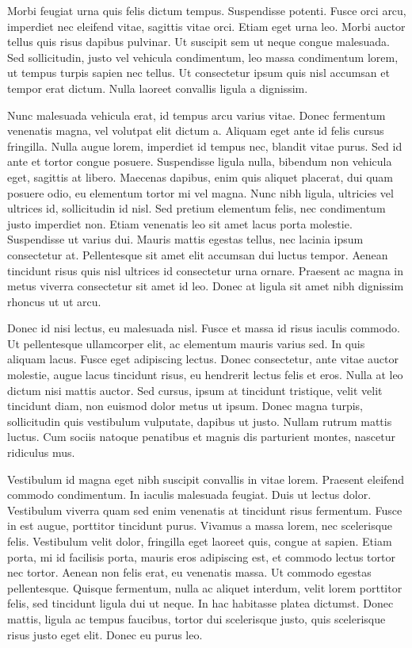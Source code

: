 \documentclass[oneside, a4paper, onecolumn, 11pt]{article}
\begin{document}
Morbi feugiat urna quis felis dictum tempus. Suspendisse potenti. Fusce orci arcu, imperdiet nec eleifend vitae, sagittis vitae orci. Etiam eget urna leo. Morbi auctor tellus quis risus dapibus pulvinar. Ut suscipit sem ut neque congue malesuada. Sed sollicitudin, justo vel vehicula condimentum, leo massa condimentum lorem, ut tempus turpis sapien nec tellus. Ut consectetur ipsum quis nisl accumsan et tempor erat dictum. Nulla laoreet convallis ligula a dignissim.

Nunc malesuada vehicula erat, id tempus arcu varius vitae. Donec fermentum venenatis magna, vel volutpat elit dictum a. Aliquam eget ante id felis cursus fringilla. Nulla augue lorem, imperdiet id tempus nec, blandit vitae purus. Sed id ante et tortor congue posuere. Suspendisse ligula nulla, bibendum non vehicula eget, sagittis at libero. Maecenas dapibus, enim quis aliquet placerat, dui quam posuere odio, eu elementum tortor mi vel magna. Nunc nibh ligula, ultricies vel ultrices id, sollicitudin id nisl. Sed pretium elementum felis, nec condimentum justo imperdiet non. Etiam venenatis leo sit amet lacus porta molestie. Suspendisse ut varius dui. Mauris mattis egestas tellus, nec lacinia ipsum consectetur at. Pellentesque sit amet elit accumsan dui luctus tempor. Aenean tincidunt risus quis nisl ultrices id consectetur urna ornare. Praesent ac magna in metus viverra consectetur sit amet id leo. Donec at ligula sit amet nibh dignissim rhoncus ut ut arcu.

Donec id nisi lectus, eu malesuada nisl. Fusce et massa id risus iaculis commodo. Ut pellentesque ullamcorper elit, ac elementum mauris varius sed. In quis aliquam lacus. Fusce eget adipiscing lectus. Donec consectetur, ante vitae auctor molestie, augue lacus tincidunt risus, eu hendrerit lectus felis et eros. Nulla at leo dictum nisi mattis auctor. Sed cursus, ipsum at tincidunt tristique, velit velit tincidunt diam, non euismod dolor metus ut ipsum. Donec magna turpis, sollicitudin quis vestibulum vulputate, dapibus ut justo. Nullam rutrum mattis luctus. Cum sociis natoque penatibus et magnis dis parturient montes, nascetur ridiculus mus.

Vestibulum id magna eget nibh suscipit convallis in vitae lorem. Praesent eleifend commodo condimentum. In iaculis malesuada feugiat. Duis ut lectus dolor. Vestibulum viverra quam sed enim venenatis at tincidunt risus fermentum. Fusce in est augue, porttitor tincidunt purus. Vivamus a massa lorem, nec scelerisque felis. Vestibulum velit dolor, fringilla eget laoreet quis, congue at sapien. Etiam porta, mi id facilisis porta, mauris eros adipiscing est, et commodo lectus tortor nec tortor. Aenean non felis erat, eu venenatis massa. Ut commodo egestas pellentesque. Quisque fermentum, nulla ac aliquet interdum, velit lorem porttitor felis, sed tincidunt ligula dui ut neque. In hac habitasse platea dictumst. Donec mattis, ligula ac tempus faucibus, tortor dui scelerisque justo, quis scelerisque risus justo eget elit. Donec eu purus leo.
\end{document}
